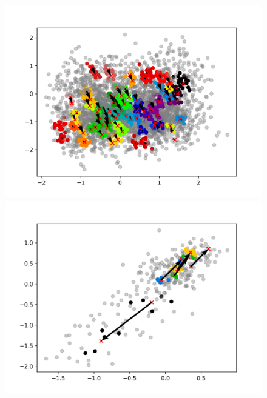 \documentclass[mscthesis]{usiinfthesis}
\begin{document}


\begin{figure}[ht] 
  \label{ fig7} 
  \begin{minipage}[b]{0.5\linewidth}
    \centering
    \includegraphics[width=\textwidth]{latentspace_cluster_species.png}
    \vspace{4ex}
  \end{minipage}%
  \begin{minipage}[b]{0.5\linewidth}
    \centering
    \includegraphics[width=\textwidth]{latentspace_cluster_region.png}

\end{minipage}
\end{figure}
\end{document}
